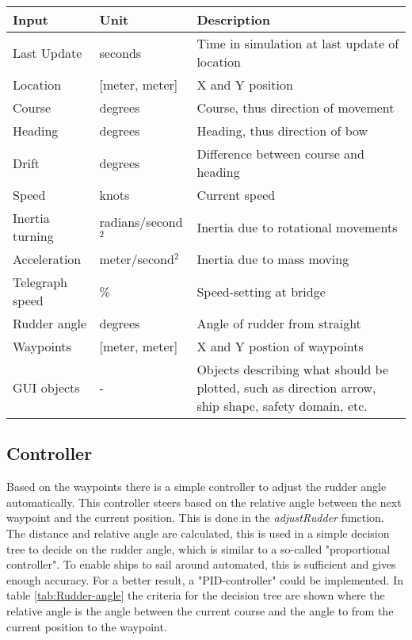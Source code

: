 \begin{table}[H]
	\centering
	\begin{tabular}{p{}|p{}|p{}}
		\toprule
		Input & Unit & Description\\
		\midrule
		Last Update & seconds & Time in simulation at last update of location \\
		Location & [meter, meter] & X and Y position \\
		Course & degrees & Course, thus direction of movement \\
		Heading & degrees & Heading, thus direction of bow \\
		Drift & degrees & Difference between course and heading \\
		Speed & knots & Current speed \\
		Inertia turning & radians/second$^2$ & Inertia due to rotational movements \\
		Acceleration & meter/second$^2$ & Inertia due to mass moving \\
		Telegraph speed & \% & Speed-setting at bridge\\
		Rudder angle & degrees & Angle of rudder from straight \\
		Waypoints & [meter, meter] & X and Y postion of waypoints\\
		GUI objects & - & Objects describing what should be plotted, such as direction arrow, ship shape, safety domain, etc.\\
		\bottomrule
	\end{tabular}
	
	\label{tab:stored-ship-characteristics}
\end{table}

\subsection{Controller}
Based on the waypoints there is a simple controller to adjust the rudder angle automatically. This controller steers based on the relative angle between the next waypoint and the current position. This is done in the \emph{adjustRudder} function. The distance and relative angle are calculated, this is used in a simple decision tree to decide on the rudder angle, which is similar to a so-called "proportional controller". To enable ships to sail around automated, this is sufficient and gives enough accuracy. For a better result, a "PID-controller" could be implemented. In table \ref{tab:Rudder-angle} the criteria for the decision tree are shown where the relative angle is the angle between the current course and the angle to from the current position to the waypoint. 

